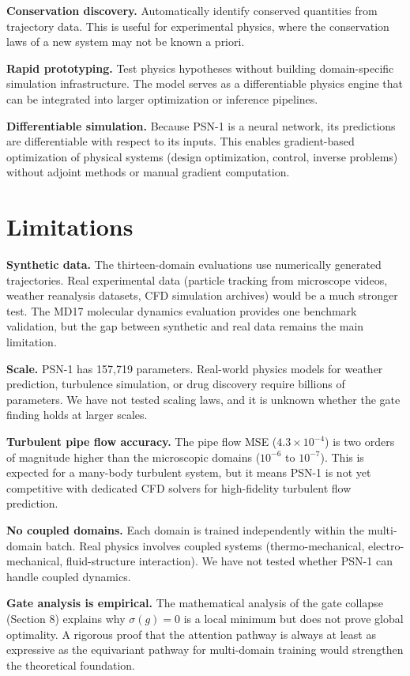\documentclass[10pt,twocolumn]{article}
\begin{document}
\textbf{Conservation discovery.} Automatically identify conserved quantities from trajectory data. This is useful for experimental physics, where the conservation laws of a new system may not be known a priori.

\textbf{Rapid prototyping.} Test physics hypotheses without building domain-specific simulation infrastructure. The model serves as a differentiable physics engine that can be integrated into larger optimization or inference pipelines.

\textbf{Differentiable simulation.} Because PSN-1 is a neural network, its predictions are differentiable with respect to its inputs. This enables gradient-based optimization of physical systems (design optimization, control, inverse problems) without adjoint methods or manual gradient computation.

\section{Limitations}

\textbf{Synthetic data.} The thirteen-domain evaluations use numerically generated trajectories. Real experimental data (particle tracking from microscope videos, weather reanalysis datasets, CFD simulation archives) would be a much stronger test. The MD17 molecular dynamics evaluation provides one benchmark validation, but the gap between synthetic and real data remains the main limitation.

\textbf{Scale.} PSN-1 has 157,719 parameters. Real-world physics models for weather prediction, turbulence simulation, or drug discovery require billions of parameters. We have not tested scaling laws, and it is unknown whether the gate finding holds at larger scales.

\textbf{Turbulent pipe flow accuracy.} The pipe flow MSE ($4.3 \times 10^{-4}$) is two orders of magnitude higher than the microscopic domains ($10^{-6}$ to $10^{-7}$). This is expected for a many-body turbulent system, but it means PSN-1 is not yet competitive with dedicated CFD solvers for high-fidelity turbulent flow prediction.

\textbf{No coupled domains.} Each domain is trained independently within the multi-domain batch. Real physics involves coupled systems (thermo-mechanical, electro-mechanical, fluid-structure interaction). We have not tested whether PSN-1 can handle coupled dynamics.

\textbf{Gate analysis is empirical.} The mathematical analysis of the gate collapse (Section 8) explains why $\sigma(g) = 0$ is a local minimum but does not prove global optimality. A rigorous proof that the attention pathway is always at least as expressive as the equivariant pathway for multi-domain training would strengthen the theoretical foundation.
\end{document}
